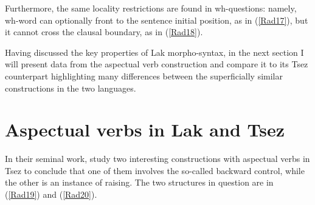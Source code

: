 \documentclass[output=paper]{langscibook}
\begin{document}
Furthermore, the same locality restrictions are found in wh-questions: namely, wh-word can optionally front to the sentence initial position, as in (\ref{Rad17}),  but it cannot cross the clausal boundary, as in (\ref{Rad18}).

\ea\label{Rad17}
\z
\ex\label{Rad18}
\z
\z

Having discussed the key properties of Lak morpho-syntax, in the next section I will present data from the aspectual verb construction and compare it to its Tsez counterpart highlighting many differences between the superficially similar constructions in the two languages.

\section{Aspectual verbs in Lak and Tsez}\label{Radsect:3}
In their seminal work, \citet{PolinskyPotsdam2002} study two interesting constructions with aspectual verbs in Tsez to conclude that one of them involves the so-called backward control, while the other is an instance of raising. The two structures in question are in (\ref{Rad19}) and (\ref{Rad20}). 
\end{document}
